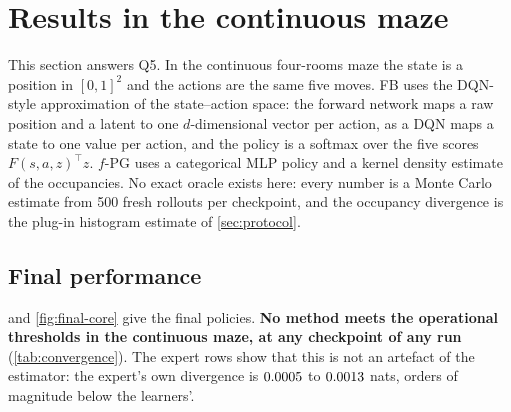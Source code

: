 \section{Results in the continuous maze}\label{sec:results-continuous}

This section answers Q5.
In the continuous four-rooms maze the state is a position in $[0,1]^2$ and the actions are the same five moves.
FB uses the DQN-style approximation of the state--action space: the forward network maps a raw position and a latent to one $d$-dimensional vector per action, as a DQN maps a state to one value per action, and the policy is a softmax over the five scores $F(s,a,z)^\top z$. $f$-PG uses a categorical MLP policy and a kernel density estimate of the occupancies.
No exact oracle exists here: every number is a Monte Carlo estimate from 500 fresh rollouts per checkpoint, and the occupancy divergence is the plug-in histogram estimate of \cref{sec:protocol}.

\subsection{Final performance}

\begin{table}[ht]
\centering\small
\caption{Continuous four-rooms maze, core suite, last checkpoint (mean $\pm$ sample SD over 3 seeds; 500 evaluation rollouts each). JS is the plug-in histogram divergence against $2{,}000$ reference expert rollouts; ``final in goal'' is the fraction of rollouts whose state $s_H$ lies in the goal region. The expert rows measure the estimator's floor.}\label{tab:continuous}

\end{table}

 and \cref{fig:final-core} give the final policies.
\textbf{No method meets the operational thresholds in the continuous maze, at any checkpoint of any run} (\cref{tab:convergence}).
The expert rows show that this is not an artefact of the estimator: the expert's own divergence is $\vn{s12.floor.lo}{0.0005}$ to $\vn{s12.floor.hi}{0.0013}$ nats,  orders of magnitude below the learners'.

